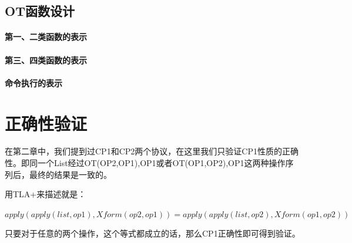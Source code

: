 \subsection{OT函数设计}
\paragraph{第一、二类函数的表示}
\paragraph{第三、四类函数的表示}
\paragraph{命令执行的表示}

\section{正确性验证}
\par 在第二章中，我们提到过CP1和CP2两个协议，在这里我们只验证CP1性质的正确性。即同一个List经过OT(OP2,OP1),OP1或者OT(OP1,OP2),OP1这两种操作序列后，最终的结果是一致的。
\par 用TLA+来描述就是：
\par $apply(apply(list,op1),Xform(op2, op1)) = apply(apply(list,op2),Xform(op1, op2)) $
\par 只要对于任意的两个操作，这个等式都成立的话，那么CP1正确性即可得到验证。